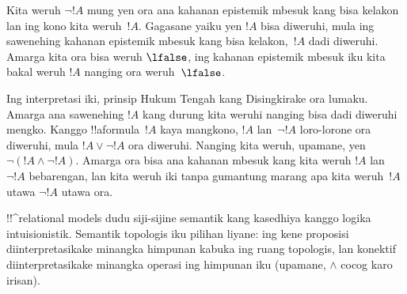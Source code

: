 \documentclass[../../../include/open-logic-section]{subfiles}
\begin{document}
Kita weruh $\lnot !A$ mung yen ora ana kahanan epistemik mbesuk kang
bisa kelakon lan ing kono kita weruh~$!A$. Gagasane yaiku yen $!A$
bisa diweruhi, mula ing sawenehing kahanan epistemik mbesuk kang bisa
kelakon,~$!A$ dadi diweruhi. Amarga kita ora bisa weruh $\lfalse$,
ing kahanan epistemik mbesuk iku kita bakal weruh $!A$ nanging ora
weruh~$\lfalse$.

Ing interpretasi iki, prinsip Hukum Tengah kang Disingkirake ora
lumaku. Amarga ana sawenehing $!A$ kang durung kita weruhi nanging
bisa dadi diweruhi mengko. Kanggo !!a{formula}~$!A$ kaya mangkono,
$!A$ lan~$\lnot !A$ loro-lorone ora diweruhi, mula
$!A \lor \lnot !A$ ora diweruhi. Nanging kita weruh, upamane,
yen $\lnot(!A \land \lnot !A)$. Amarga ora bisa ana kahanan mbesuk
kang kita weruh $!A$ lan $\lnot !A$ bebarengan, lan kita weruh iki
tanpa gumantung marang apa kita weruh~$!A$ utawa $\lnot !A$ utawa ora.

!!^{relational model}s dudu siji-sijine semantik kang kasedhiya
kanggo logika intuisionistik. Semantik topologis iku pilihan liyane:
ing kene proposisi diinterpretasikake minangka himpunan kabuka ing
ruang topologis, lan konektif diinterpretasikake minangka operasi
ing himpunan iku (upamane, $\land$ cocog karo irisan).
\end{document}
